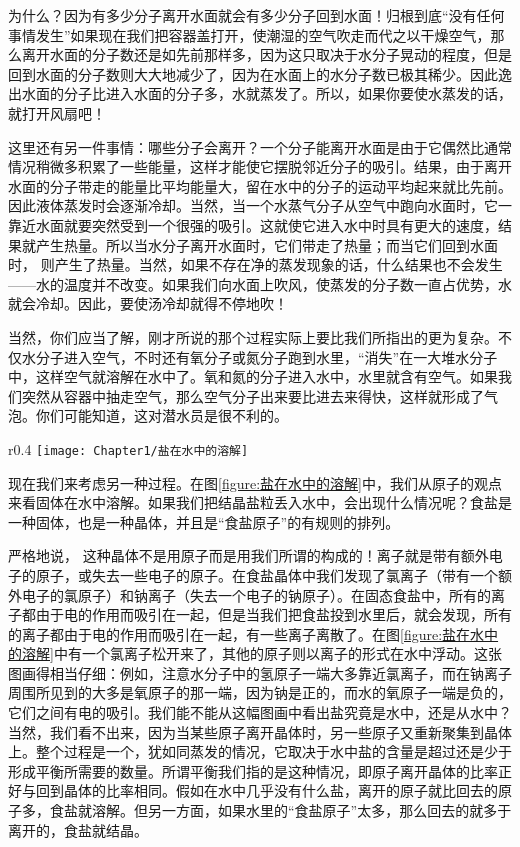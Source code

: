 为什么？因为有多少分子离开水面就会有多少分子回到水面！归根到底“没有任何事情发生”如果现在我们把容器盖打开，使潮湿的空气吹走而代之以干燥空气，那么离开水面的分子数还是如先前那样多，因为这只取决于水分子晃动的程度，但是回到水面的分子数则大大地减少了，因为在水面上的水分子数已极其稀少。因此逸出水面的分子比进入水面的分子多，水就蒸发了。所以，如果你要使水蒸发的话，就打开风扇吧！

这里还有另一件事情：哪些分子会离开？一个分子能离开水面是由于它偶然比通常情况稍微多积累了一些能量，这样才能使它摆脱邻近分子的吸引。结果，由于离开水面的分子带走的能量比平均能量大，留在水中的分子的运动平均起来就比先前。因此液体蒸发时会逐渐冷却。当然，当一个水蒸气分子从空气中跑向水面时，它一靠近水面就要突然受到一个很强的吸引。这就使它进入水中时具有更大的速度，结果就产生热量。所以当水分子离开水面时，它们带走了热量；而当它们回到水面时， 则产生了热量。当然，如果不存在净的蒸发现象的话，什么结果也不会发生——水的温度并不改变。如果我们向水面上吹风，使蒸发的分子数一直占优势，水就会冷却。因此，要使汤冷却就得不停地吹！

当然，你们应当了解，刚才所说的那个过程实际上要比我们所指出的更为复杂。不仅水分子进入空气，不时还有氧分子或氮分子跑到水里，“消失”在一大堆水分子中，这样空气就溶解在水中了。氧和氮的分子进入水中，水里就含有空气。如果我们突然从容器中抽走空气，那么空气分子出来要比进去来得快，这样就形成了气泡。你们可能知道，这对潜水员是很不利的。

\begin{wrapfigure}{r}{0.4\textwidth}
    \centering
    \texttt{[image: Chapter1/盐在水中的溶解]}
    \caption{盐在水中的溶解}
    \label{figure:盐在水中的溶解}
\end{wrapfigure}
现在我们来考虑另一种过程。在图\ref{figure:盐在水中的溶解}中，我们从原子的观点来看固体在水中溶解。如果我们把结晶盐粒丢入水中，会出现什么情况呢？食盐是一种固体，也是一种晶体，并且是“食盐原子”的有规则的排列。

严格地说， 这种晶体不是用原子而是用我们所谓的构成的！离子就是带有额外电子的原子，或失去一些电子的原子。在食盐晶体中我们发现了氯离子（带有一个额外电子的氯原子）和钠离子（失去一个电子的钠原子）。在固态食盐中，所有的离子都由于电的作用而吸引在一起，但是当我们把食盐投到水里后，就会发现，所有的离子都由于电的作用而吸引在一起，有一些离子离散了。在图\ref{figure:盐在水中的溶解}中有一个氯离子松开来了，其他的原子则以离子的形式在水中浮动。这张图画得相当仔细：例如，注意水分子中的氢原子一端大多靠近氯离子，而在钠离子周围所见到的大多是氧原子的那一端，因为钠是正的，而水的氧原子一端是负的，它们之间有电的吸引。我们能不能从这幅图画中看出盐究竟是水中，还是从水中？当然，我们看不出来，因为当某些原子离开晶体时，另一些原子又重新聚集到晶体上。整个过程是一个，犹如同蒸发的情况，它取决于水中盐的含量是超过还是少于形成平衡所需要的数量。所谓平衡我们指的是这种情况，即原子离开晶体的比率正好与回到晶体的比率相同。假如在水中几乎没有什么盐，离开的原子就比回去的原子多，食盐就溶解。但另一方面，如果水里的“食盐原子”太多，那么回去的就多于离开的，食盐就结晶。

